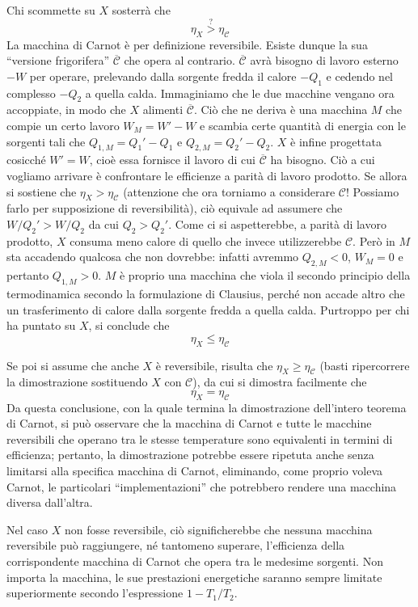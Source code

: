 Chi scommette su $X$ sosterrà che \[\eta_X \stackrel{?}{>} \eta_\mathcal{C} \]
La macchina di Carnot è per definizione reversibile. Esiste dunque
la sua ``versione frigorifera'' $\overline{\mathcal{C}}$ che opera al contrario.
$\overline{\mathcal{C}}$ avrà bisogno di lavoro esterno $-W$ per operare,
prelevando dalla sorgente fredda il calore $-Q_1$ e cedendo nel
complesso $-Q_2$ a quella calda. Immaginiamo che le due macchine
vengano ora accoppiate, in modo che $X$ alimenti $\overline{\mathcal{C}}$.
Ciò che ne deriva è una macchina $M$ che compie un certo lavoro
$W_M = W' - W$ e scambia certe quantità di energia con le sorgenti
tali che $Q_{1,M} = Q_1'-Q_1$ e $Q_{2,M} = Q_2' - Q_2$. $X$ è infine
progettata cosicché $W' = W$, cioè essa fornisce il lavoro di cui
$\overline{\mathcal{C}}$ ha bisogno. Ciò a cui vogliamo arrivare è
confrontare le efficienze a parità di lavoro prodotto.
Se allora si sostiene che $\eta_X > \eta_\mathcal{C}$ (attenzione che
ora torniamo a considerare $\mathcal{C}$! Possiamo farlo per supposizione
di reversibilità), ciò equivale
ad assumere che $W/Q_2' > W/Q_2$ da cui $Q_2 > Q_2'$. Come ci si
aspetterebbe, a parità di lavoro prodotto, $X$ consuma meno calore di
quello che invece utilizzerebbe $\mathcal{C}$.
Però in $M$ sta accadendo qualcosa che non dovrebbe: infatti
avremmo $Q_{2,M} < 0$, $W_M = 0$ e pertanto $Q_{1,M} > 0$. $M$ è proprio
una macchina che viola il secondo principio della
termodinamica secondo la formulazione di Clausius, perché non accade
altro che un trasferimento di calore dalla sorgente fredda a quella calda.
Purtroppo per chi ha puntato su $X$, si conclude che \[ \eta_X \leq \eta_\mathcal{C} \]

Se poi si assume che anche $X$ è reversibile, risulta che
$\eta_X \geq \eta_\mathcal{C}$ (basti ripercorrere la dimostrazione
sostituendo $X$ con $\mathcal{C}$), da cui si dimostra facilmente
che \[ \eta_X = \eta_\mathcal{C} \] Da questa conclusione, con
la quale termina la dimostrazione dell'intero teorema di Carnot,
si può osservare che la macchina di Carnot e tutte le macchine
reversibili che operano tra le stesse temperature sono equivalenti
in termini di efficienza; pertanto, la dimostrazione potrebbe essere
ripetuta anche senza limitarsi alla specifica macchina di Carnot,
eliminando, come proprio voleva Carnot, le particolari ``implementazioni''
che potrebbero rendere una macchina diversa dall'altra.

Nel caso $X$ non fosse reversibile, ciò significherebbe che
nessuna macchina reversibile può raggiungere, né tantomeno
superare, l'efficienza della corrispondente macchina di Carnot
che opera tra le medesime sorgenti. Non importa la macchina,
le sue prestazioni energetiche saranno sempre limitate superiormente
secondo l'espressione $1 - T_1/T_2$.

